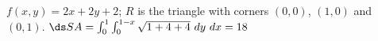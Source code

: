 {$f(x,y) = 2x+2y+2$; $R$ is the triangle with corners $(0,0)$, $(1,0)$ and $(0,1)$.
}
{$\ds SA = \int_{0}^{1}\int_{0}^{1-x} \sqrt{1+ 4+4}\ dy\ dx = 18$
}